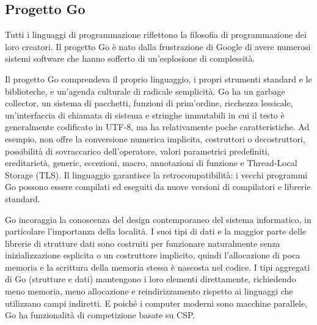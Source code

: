 \documentclass[../../thesis.tex]{subfiles}
\begin{document}
    \subsection*{Progetto Go}
    Tutti i linguaggi di programmazione riflettono la filosofia di programmazione dei loro creatori.
    Il progetto Go è nato dalla frustrazione di Google di avere numerosi sistemi software che hanno sofferto di un'esplosione di complessità.
    \hfill \vspace{12pt}

    Il progetto Go comprendeva il proprio linguaggio, i propri strumenti standard e le biblioteche, e un'agenda culturale di radicale semplicità.
    Go ha un garbage collector, un sistema di pacchetti, funzioni di prim'ordine, ricchezza lessicale, un'interfaccia di chiamata di sistema e stringhe immutabili in cui il testo è generalmente codificato in UTF-8, ma ha relativamente poche caratteristiche.
    Ad esempio, non offre la conversione numerica implicita, costruttori o decostruttori, possibilità di sovraccarico dell'operatore, valori parametrici predefiniti, ereditarietà, generic, eccezioni, macro, annotazioni di funzione e Thread-Local Storage (TLS).
    Il linguaggio garantisce la retrocompatibilità: i vecchi programmi Go possono essere compilati ed eseguiti da nuove versioni di compilatori e librerie standard.
    \hfill \vspace{12pt}

    Go incoraggia la conoscenza del design contemporaneo del sistema informatico, in particolare l'importanza della località.
    I suoi tipi di dati e la maggior parte delle librerie di strutture dati sono costruiti per funzionare naturalmente senza inizializzazione esplicita o un costruttore implicito, quindi l'allocazione di poca memoria e la scrittura della memoria stessa è nascosta nel codice.
    I tipi aggregati di Go (strutture e dati) mantengono i loro elementi direttamente, richiedendo meno memoria, meno allocazione e reindirizzamento rispetto ai linguaggi che utilizzano campi indiretti.
    E poiché i computer moderni sono macchine parallele, Go ha funzionalità di competizione basate su CSP\@.
\end{document}
